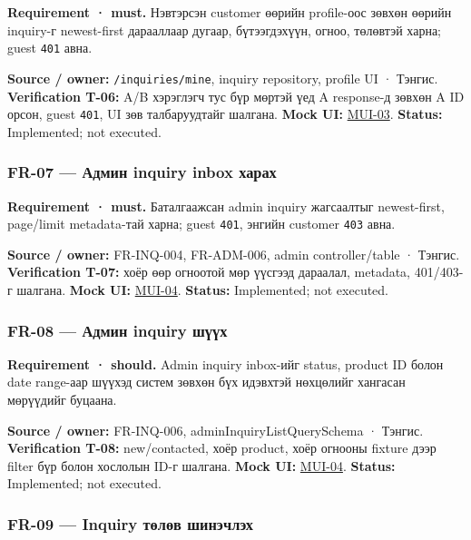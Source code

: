 \documentclass[
  mongolian,
]{article}
\begin{document}
\textbf{Requirement · must.} Нэвтэрсэн customer өөрийн profile-оос
зөвхөн өөрийн inquiry-г newest-first дарааллаар дугаар, бүтээгдэхүүн,
огноо, төлөвтэй харна; guest \texttt{401} авна.

\textbf{Source / owner:} \texttt{/inquiries/mine}, inquiry repository,
profile UI · Тэнгис. \textbf{Verification T-06:} A/B хэрэглэгч тус бүр
мөртэй үед A response-д зөвхөн A ID орсон, guest \texttt{401}, UI зөв
талбаруудтайг шалгана. \textbf{Mock UI:}
\href{../assets/03-inquiry-history.png}{MUI-03}. \textbf{Status:}
Implemented; not executed.

\subsubsection{FR-07 --- Админ inquiry inbox
харах}\label{fr-07-ux430ux434ux43cux438ux43d-inquiry-inbox-ux445ux430ux440ux430ux445}

\textbf{Requirement · must.} Баталгаажсан admin inquiry жагсаалтыг
newest-first, page/limit metadata-тай харна; guest \texttt{401}, энгийн
customer \texttt{403} авна.

\textbf{Source / owner:} FR-INQ-004, FR-ADM-006, admin controller/table
· Тэнгис. \textbf{Verification T-07:} хоёр өөр огноотой мөр үүсгээд
дараалал, metadata, 401/403-г шалгана. \textbf{Mock UI:}
\href{../assets/04-admin-inbox.png}{MUI-04}. \textbf{Status:}
Implemented; not executed.

\subsubsection{FR-08 --- Админ inquiry
шүүх}\label{fr-08-ux430ux434ux43cux438ux43d-inquiry-ux448ux4afux4afux445}

\textbf{Requirement · should.} Admin inquiry inbox-ийг status, product
ID болон date range-аар шүүхэд систем зөвхөн бүх идэвхтэй нөхцөлийг
хангасан мөрүүдийг буцаана.

\textbf{Source / owner:} FR-INQ-006, adminInquiryListQuerySchema ·
Тэнгис. \textbf{Verification T-08:} new/contacted, хоёр product, хоёр
огнооны fixture дээр filter бүр болон хослолын ID-г шалгана.
\textbf{Mock UI:} \href{../assets/04-admin-inbox.png}{MUI-04}.
\textbf{Status:} Implemented; not executed.

\subsubsection{FR-09 --- Inquiry төлөв
шинэчлэх}\label{fr-09-inquiry-ux442ux4e9ux43bux4e9ux432-ux448ux438ux43dux44dux447ux43bux44dux445}
\end{document}
